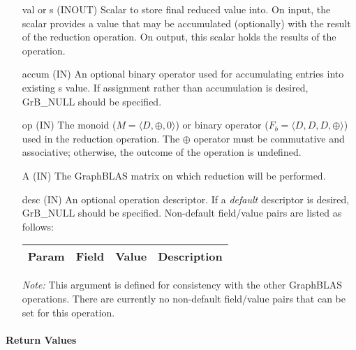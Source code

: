 \begin{itemize}[leftmargin=1.1in]
    \item[{\sf val} or {\sf s}] ({\sf INOUT}) Scalar to store final reduced value into. On input,
    the scalar provides a value that may be accumulated (optionally) with the result of the
    reduction operation.  On output, this scalar holds the results of the
    operation.

    \item[{\sf accum}] ({\sf IN}) An optional binary operator used for accumulating
    entries into existing {\sf s} value. If assignment rather than accumulation is
    desired, {\sf GrB\_NULL} should be specified.

    \item[{\sf op}]    ({\sf IN}) The monoid ($M = \langle D,\oplus,0 \rangle$) or binary operator 
    ($F_b = \langle D, D, D, \oplus \rangle$) used in the reduction operation. The $\oplus$ operator 
    must be commutative and associative; otherwise, the outcome of the operation is undefined.  
    
    \item[{\sf A}]     ({\sf IN}) The GraphBLAS matrix on which
    reduction will be performed.

    \item[{\sf desc}] ({\sf IN}) An optional operation descriptor. If
    a \emph{default} descriptor is desired, {\sf GrB\_NULL} should be
    specified. Non-default field/value pairs are listed as follows:  \\

    \begin{tabular}{lllp{2.5in}}
        Param & Field  & Value & Description \\
        \hline
    \end{tabular}

    \emph{Note:} This argument is defined for consistency with the other GraphBLAS operations.
    There are currently no non-default field/value pairs that can be set for this operation.
\end{itemize}

\paragraph{Return Values}

